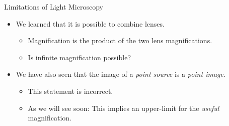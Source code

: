\begin{frame}{Limitations of Light Microscopy}
	\begin{itemize}
		\item<1-> We learned that it is possible to combine lenses.
		      \begin{itemize}
			      \item<2-> Magnification is the product of the two lens magnifications.
			      \item<3-> Is infinite magnification possible?
		      \end{itemize}
		\item<4-> We have also seen that the image of a \textit{point source} is a \textit{point image}.
		      \begin{itemize}
			      \item<5-> This statement is incorrect.
			      \item<6-> As we will see soon: This implies an upper-limit for the \textit{useful} magnification.
		      \end{itemize}
	\end{itemize}
\end{frame}
